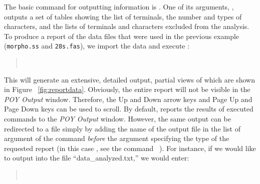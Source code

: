 {The basic command for outputting information is . One of its arguments, , outputs a set of tables showing the list of terminals, the number and types of characters, and the lists of terminals and characters excluded from the analysis. To produce a report of the data files that were used in the previous example (\texttt{morpho.ss} and \texttt{28s.fas}), we import the data and execute :
\begin{quote}
    \\
\end{quote}
This will generate an extensive, detailed output, partial views of which are shown in Figure ~\ref{fig:reportdata}. Obviously, the entire report will not be visible in the \emph{POY Output} window. Therefore, the Up and Down arrow keys and Page Up and Page Down keys can be used to scroll.  By default, \poy reports the results of executed commands to the \emph{POY Output} window. However, the same output can be redirected to a file simply by adding the name of the output file in the list of argument of the command  \emph{before} the argument specifying the type of the requested report (in this case , see the command~ ). For instance, if we would like to output into the file ``data\_analyzed.txt,'' we would enter:
\begin{quote}
    \\
\end{quote}

}
